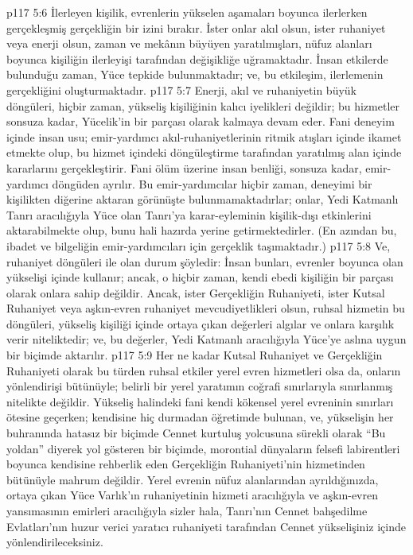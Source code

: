 \vs p117 5:6 İlerleyen kişilik, evrenlerin yükselen aşamaları boyunca ilerlerken gerçekleşmiş gerçekliğin bir izini bırakır. İster onlar akıl olsun, ister ruhaniyet veya enerji olsun, zaman ve mekânın büyüyen yaratılmışları, nüfuz alanları boyunca kişiliğin ilerleyişi tarafından değişikliğe uğramaktadır. İnsan etkilerde bulunduğu zaman, Yüce tepkide bulunmaktadır; ve, bu etkileşim, ilerlemenin gerçekliğini oluşturmaktadır.
\vs p117 5:7 Enerji, akıl ve ruhaniyetin büyük döngüleri, hiçbir zaman, yükseliş kişiliğinin kalıcı iyelikleri değildir; bu hizmetler sonsuza kadar, Yücelik’in bir parçası olarak kalmaya devam eder. Fani deneyim içinde insan usu; emir\hyp{}yardımcı akıl\hyp{}ruhaniyetlerinin ritmik atışları içinde ikamet etmekte olup, bu hizmet içindeki döngüleştirme tarafından yaratılmış alan içinde kararlarını gerçekleştirir. Fani ölüm üzerine insan benliği, sonsuza kadar, emir\hyp{}yardımcı döngüden ayrılır. Bu emir\hyp{}yardımcılar hiçbir zaman, deneyimi bir kişilikten diğerine aktaran görünüşte bulunmamaktadırlar; onlar, Yedi Katmanlı Tanrı aracılığıyla Yüce olan Tanrı’ya karar\hyp{}eyleminin kişilik\hyp{}dışı etkinlerini aktarabilmekte olup, bunu hali hazırda yerine getirmektedirler. (En azından bu, ibadet ve bilgeliğin emir\hyp{}yardımcıları için gerçeklik taşımaktadır.)
\vs p117 5:8 Ve, ruhaniyet döngüleri ile olan durum şöyledir: İnsan bunları, evrenler boyunca olan yükselişi içinde kullanır; ancak, o hiçbir zaman, kendi ebedi kişiliğin bir parçası olarak onlara sahip değildir. Ancak, ister Gerçekliğin Ruhaniyeti, ister Kutsal Ruhaniyet veya aşkın\hyp{}evren ruhaniyet mevcudiyetlikleri olsun, ruhsal hizmetin bu döngüleri, yükseliş kişiliği içinde ortaya çıkan değerleri algılar ve onlara karşılık verir niteliktedir; ve, bu değerler, Yedi Katmanlı aracılığıyla Yüce’ye aslına uygun bir biçimde aktarılır.
\vs p117 5:9 Her ne kadar Kutsal Ruhaniyet ve Gerçekliğin Ruhaniyeti olarak bu türden ruhsal etkiler yerel evren hizmetleri olsa da, onların yönlendirişi bütünüyle; belirli bir yerel yaratımın coğrafi sınırlarıyla sınırlanmış nitelikte değildir. Yükseliş halindeki fani kendi kökensel yerel evreninin sınırları ötesine geçerken; kendisine hiç durmadan öğretimde bulunan, ve, yükselişin her buhranında hatasız bir biçimde Cennet kurtuluş yolcusuna sürekli olarak “Bu yoldan” diyerek yol gösteren bir biçimde, morontial dünyaların felsefi labirentleri boyunca kendisine rehberlik eden Gerçekliğin Ruhaniyeti’nin hizmetinden bütünüyle mahrum değildir. Yerel evrenin nüfuz alanlarından ayrıldığınızda, ortaya çıkan Yüce Varlık’ın ruhaniyetinin hizmeti aracılığıyla ve aşkın\hyp{}evren yansımasının emirleri aracılığıyla sizler hala, Tanrı’nın Cennet bahşedilme Evlatları’nın huzur verici yaratıcı ruhaniyeti tarafından Cennet yükselişiniz içinde yönlendirileceksiniz.
